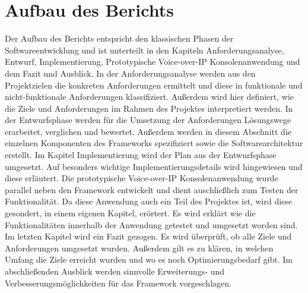 \section{Aufbau des Berichts}
Der Aufbau des Berichts entspricht den klassischen Phasen der Softwareentwicklung und ist unterteilt in den Kapiteln Anforderungsanalyse, Entwurf, Implementierung, Prototypische Voice-over-IP Konsolenanwendung und dem Fazit und Ausblick. 
In der Anforderungsanalyse werden aus den Projektzielen die konkreten Anforderungen ermittelt und diese in funktionale und nicht-funktionale Anforderungen klassifiziert. Außerdem wird hier definiert, wie die Ziele und Anforderungen im Rahmen des Projektes interpretiert werden.
In der Entwurfsphase werden für die Umsetzung der Anforderungen Lösungswege erarbeitet, verglichen und bewertet. Außerdem werden in diesem Abschnitt die einzelnen Komponenten des Frameworks spezifiziert sowie die Softwarearchitektur erstellt.
Im Kapitel Implementierung wird der Plan aus der Entwurfsphase umgesetzt. Auf besonders wichtige Implementierungsdetails wird hingewiesen und diese erläutert. 
Die prototypische Voice-over-IP Konsolenanwendung wurde parallel neben den Framework entwickelt und dient auschließlich zum Testen der Funktionalität. Da diese Anwendung auch ein Teil des Projektes ist, wird diese gesondert, in einem eigenen Kapitel, erörtert. Es wird erklärt wie die Funktionalitäten innerhalb der Anwendung getestet und umgesetzt worden sind.
Im letzten Kapitel wird ein Fazit gezogen. Es wird überprüft, ob alle Ziele und Anforderungen umgesetzt wurden. Außerdem gilt es zu klären, in welchen Umfang die Ziele erreicht wurden und wo es noch Optimierungsbedarf gibt. Im abschließenden Ausblick werden sinnvolle Erweiterungs- und Verbesserungsmöglichkeiten für das Framework vorgeschlagen.
	
